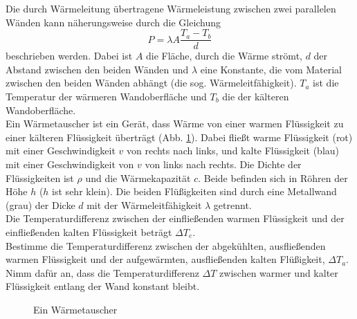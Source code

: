 \begin{Exercise}[label=heate, origin = {US IPhO Auswahlwettbewerb, Halbfinale 2013}, title = Wärmetauscher]
Die durch Wärmeleitung übertragene Wärmeleistung zwischen zwei parallelen Wänden kann näherungsweise durch die Gleichung 
\begin{equation}\label{he:fg}
	P = \lambda A \frac{T_a-T_b}{d}
\end{equation}
beschrieben werden. Dabei ist $A$ die Fläche, durch die Wärme strömt, $d$ der Abstand zwischen den beiden Wänden und $\lambda$ eine Konstante, die vom Material zwischen den beiden Wänden abhängt (die sog. Wärmeleitfähigkeit). $T_a$ ist die Temperatur der wärmeren Wandoberfläche und $T_b$ die der kälteren Wandoberfläche.\\
Ein Wärmetauscher ist ein Gerät, dass Wärme von einer warmen Flüssigkeit zu einer kälteren Flüssigkeit überträgt (Abb. \ref{fig:heate}).
Dabei fließt warme Flüssigkeit (rot) mit einer Geschwindigkeit $v$ von rechts nach links, und kalte Flüssigkeit (blau) mit einer Geschwindigkeit von $v$ von links nach rechts. Die Dichte der Flüssigkeiten ist $\rho$ und die Wärmekapazität $c$. Beide befinden sich in Röhren der Höhe $h$ ($h$ ist sehr klein).  Die beiden Flüßigkeiten sind durch eine Metallwand (grau) der Dicke $d$ mit der Wärmeleitfähigkeit $\lambda$ getrennt. \\
Die Temperaturdifferenz zwischen der einfließenden warmen Flüssigkeit und der einfließenden kalten Flüssigkeit beträgt $\Delta T_e$. \\
Bestimme die Temperaturdifferenz zwischen der abgekühlten, ausfließenden warmen Flüssigkeit und der aufgewärmten, ausfließenden kalten Flüßigkeit, $\Delta T_a$. Nimm dafür an, dass die Temperaturdifferenz $\Delta T$ zwischen warmer und kalter Flüssigkeit entlang der Wand konstant bleibt.

\end{Exercise}
\begin{figure}[h]
	\centering
	
	\caption{Ein Wärmetauscher}
	\label{fig:heate}
\end{figure}